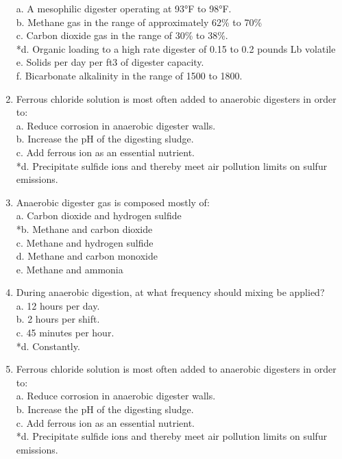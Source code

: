 \documentclass{article}
\begin{document}
\begin{enumerate}
a. A mesophilic digester operating at 93°F to 98°F. \\
b. Methane gas in the range of approximately 62\% to 70\% \\
c. Carbon dioxide gas in the range of 30\% to 38\%. \\
*d. Organic loading to a high rate digester of 0.15 to 0.2 pounds Lb volatile \\
e. Solids per day per ft3 of digester capacity. \\
f. Bicarbonate alkalinity in the range of 1500 to 1800. \\

\item  Ferrous chloride solution is most often added to anaerobic digesters in order to: \\

a. Reduce corrosion in anaerobic digester walls. \\
b. Increase the pH of the digesting sludge. \\
c. Add ferrous ion as an essential nutrient. \\
*d. Precipitate sulfide ions and thereby meet air pollution limits on sulfur emissions. \\

\item  Anaerobic digester gas is composed mostly of: \\

a. Carbon dioxide and hydrogen sulfide \\
*b. Methane and carbon dioxide \\
c. Methane and hydrogen sulfide \\
d. Methane and carbon monoxide \\
e. Methane and ammonia \\

\item  During anaerobic digestion, at what frequency should mixing be applied? \\

a. 12 hours per day. \\
b. 2 hours per shift. \\
c. 45 minutes per hour. \\
*d. Constantly. \\

\item  Ferrous chloride solution is most often added to anaerobic digesters in order to: \\

a. Reduce corrosion in anaerobic digester walls. \\
b. Increase the pH of the digesting sludge. \\
c. Add ferrous ion as an essential nutrient. \\
*d. Precipitate sulfide ions and thereby meet air pollution limits on sulfur emissions. \\


\end{enumerate}
\end{document}

